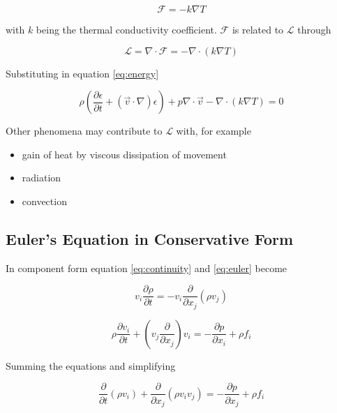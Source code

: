 \documentclass{article}
\begin{document}
\begin{equation*}
  \mathcal{F}=-k \nabla T
\end{equation*}

with $k$ being the thermal conductivity coefficient. $\mathcal{F}$ is related to
$\mathcal{L}$ through

\begin{equation*}
  \mathcal{L}=\nabla \cdot \mathcal{F}=-\nabla \cdot(k \nabla T)
\end{equation*}

Substituting in equation \ref{eq:energy}

\begin{equation*}
  \rho\left(\frac{\partial \epsilon}{\partial t}+(\vec{v} \cdot \nabla) \epsilon\right)+p \nabla \cdot \vec{v}-\nabla \cdot(k \nabla T)=0
\end{equation*}

Other phenomena may contribute to $\mathcal{L}$ with, for example

\begin{itemize}
\item gain of heat by viscous dissipation of movement 
\item radiation
\item convection   
\end{itemize}


\subsection{Euler's Equation in Conservative Form}

In component form equation \ref{eq:continuity} and \ref{eq:euler} become

\begin{equation*}
  v_{i} \frac{\partial \rho}{\partial t}=-v_{i} \frac{\partial}{\partial x_{j}}\left(\rho v_{j}\right)
\end{equation*}

\begin{equation*}
  \rho \frac{\partial v_{i}}{\partial t}+\left(v_{j} \frac{\partial}{\partial x_{j}}\right) v_{i}=-\frac{\partial p}{\partial x_{i}}+\rho f_{i}
\end{equation*}

Summing the equations and simplifying

\begin{equation*}
  \frac{\partial}{\partial t}\left(\rho v_{i}\right)+\frac{\partial}{\partial x_{j}}\left(\rho v_{i} v_{j}\right)=-\frac{\partial p}{\partial x_{j}}+\rho f_{i}
\end{equation*}
\end{document}
